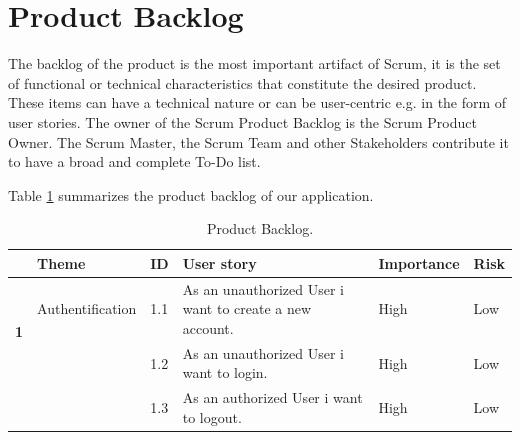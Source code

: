 \documentclass[12pt,a4paper]{report}
\begin{document}
	\section{Product Backlog}
	The backlog of the product is the most important artifact of Scrum, it is the set of functional or technical characteristics that constitute the desired product. These items can have a technical nature or can be user-centric e.g. in the form of user stories. The owner of the Scrum Product Backlog is the Scrum Product Owner. The Scrum Master, the Scrum Team and other Stakeholders contribute it to have a broad and complete To-Do list.\par
	Table \ref{table-backlog-product} summarizes the product backlog of our application.\par 
	\begin{table}[H]
		\begin{center}
			\captionsetup[table]{skip=10pt}
			\caption{\label{table-backlog-product} Product Backlog.}
			\setlength\doublerulesep{0.5pt}
			\begin{tabular}{|  p{1cm}|  p{4cm}|  p{1cm}| p{5cm}|  p{2cm}| p{2cm}|}
				\hline 
				\rowcolor{LightCyan}
				\textbf{ } & \textbf{Theme} & \textbf{ID} & \textbf{User story} & \textbf{Importance} & \textbf{Risk} 
				\\ \hline
				\multirow{2}{*}{\textbf{1} }
				&                        
				Authentification &                        
				1.1 &                        
				As an unauthorized User i want to create a new account.&                        
				High &                        
				Low
				\\
				\cline{3-6}
				&                        
				&                        
				1.2 &                        
				As an unauthorized User i want to login.&                        
				High &                        
				Low
				\\
				\cline{3-6}
				&                        
				&                        
				1.3 &                        
				As an authorized User i want to logout.&                        
				High &                        
				Low
				

\end{tabular}
\end{center}
\end{table}
\end{document}

